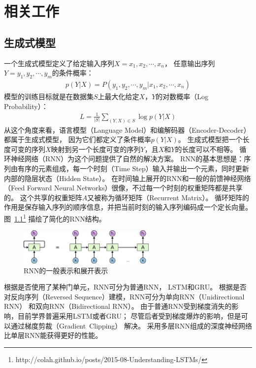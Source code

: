
\chapter{相关工作}\label{ch:related_work}
\section{生成式模型}\label{sec:generative_model}
一个生成式模型定义了给定输入序列$X = x_1, x_2, \cdots, x_n$，
任意输出序列$Y = y_1, y_2, \cdots, y_m$的条件概率：
\begin{align}
    p(Y|X) = P(y_1, y_2, \cdots, y_m|x_1, x_2, \cdots, x_n)
    \label{eqn:generative_conditional_probability}
\end{align}
模型的训练目标就是在数据集$S$上最大化给定$X$，$Y$的对数概率（Log Probability）：
\begin{align}
    \mathit{L} = \frac{1}{|S|} \sum_{(Y, X) \in S} \log p(Y|X)
\end{align}
从这个角度来看，语言模型（Language Model）和编解码器（Encoder-Decoder）都属于生成式模型，
因为它们都定义了条件概率$p(Y|X)$。
生成式模型把一个长度可变的序列$X$映射到另一个长度可变的序列$Y$，且$X$和$Y$的长度可以不相等。
循环神经网络（RNN）为这个问题提供了自然的解决方案。
RNN的基本思想是：序列由有序的元素组成，每一个时刻（Time Step）输入并输出一个元素，同时更新内部的隐层状态（Hidden State）。
在时间轴上展开的RNN和一般的前馈神经网络（Feed Forward Neural Networks）很像，不过每一个时刻的权重矩阵都是共享的。
这个共享的权重矩阵$A$又被称为循环矩阵（Recurrent Matrix）。
循环矩阵的作用是保存输入序列的顺序信息，并把当前时刻的输入序列编码成一个定长向量。
图~\ref{fig:RNN_unrolled}\footnote{http://colah.github.io/posts/2015-08-Understanding-LSTMs/}
描绘了简化的RNN结构。
\begin{figure}[H]
    \centering
    \includegraphics[width=0.6\textwidth]{figure/RNN-unrolled.png}
    \caption{RNN的一般表示和展开表示}
    \label{fig:RNN_unrolled}
\end{figure}

根据是否使用了某种门单元，RNN可分为普通RNN，
LSTM和GRU。
根据是否对反向序列（Reversed Sequence）建模，RNN可分为单向RNN（Unidirectional RNN）
和双向RNN（Bidirectional RNN）。
由于普通RNN受到梯度消失的影响，目前学界普遍采用LSTM或者GRU；
尽管后者受到梯度爆炸的影响，但是可以通过梯度剪裁（Gradient~Clipping）
解决。
采用多层RNN组成的深度神经网络比单层RNN能获得更好的性能。

